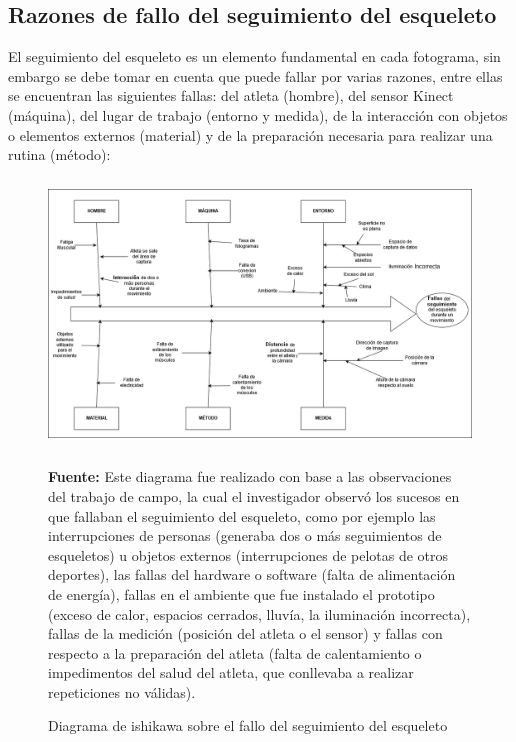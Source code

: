 \begin{landscape}
\section{Razones de fallo del seguimiento del esqueleto}
El seguimiento del esqueleto es un elemento  fundamental en cada fotograma, sin embargo se debe tomar en cuenta que puede fallar por varias razones, entre ellas se encuentran las siguientes fallas: del atleta (hombre), del sensor Kinect (m\'aquina), del lugar de trabajo (entorno y  medida), de la interacci\'on  con objetos o elementos externos (material) y de la preparaci\'on necesaria para realizar una rutina (m\'etodo):
\begin{figure}[H]
	\caption{Diagrama de ishikawa sobre el fallo del seguimiento del esqueleto}
	\label{fig:ishikawa}
	 \begin{center}
	\includegraphics[width=500px,height=270px]{graphics/resultados/Ishi-SeguimientoDeEsqueleto.PNG}	 \\
	\end{center}
	\textbf{Fuente:} Este diagrama fue realizado con base a las observaciones del trabajo de campo, la cual el investigador observ\'o los sucesos en que fallaban el seguimiento del esqueleto, como por ejemplo las interrupciones de personas (generaba dos o m\'as seguimientos de esqueletos) u objetos externos (interrupciones de pelotas de otros deportes), las fallas del hardware o software (falta de alimentaci\'on de energ\'ia), fallas en el ambiente que fue instalado el prototipo (exceso de calor, espacios cerrados, lluv\'ia, la iluminaci\'on incorrecta), fallas de la medici\'on (posici\'on del atleta o el sensor) y  fallas con respecto a la preparaci\'on del atleta (falta de calentamiento o impedimentos del salud del atleta, que conllevaba a realizar repeticiones no v\'alidas).
\end{figure}
\end{landscape}
